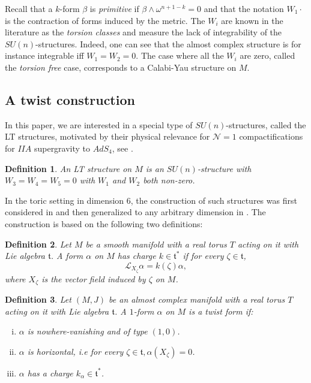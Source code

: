 \documentclass[12pt, reqno]{amsart}
\newtheorem{Def}{Definition}[subsection]
\theoremstyle{definition}
\newcommand{\tor}{\mathfrak{t}}
\newcommand{\lied}{\mathcal{L}}
\begin{document}
    Recall that a $k$-form $\beta$ is \textit{primitive} if $\beta\wedge\omega^{n+1-k}=0$ and that the notation $W_1\cdot$ is the contraction of forms induced by the metric. The $W_i$ are known in the literature as the \textit{torsion classes} and measure the lack of integrability of the $SU(n)$-structures. Indeed, one can see that the almost complex structure is for instance integrable iff $W_1=W_2=0$. The case where all the $W_i$ are zero, called the \textit{torsion free} case, corresponds to a Calabi-Yau structure on $M$.
\subsection{A twist construction}\label{2.2}
In this paper, we are interested in a special type of $SU(n)$-structures, called the LT structures, motivated by their physical relevance for $\mathcal{N}=1$ compactifications for $IIA$ supergravity to $AdS_4$, see \cite{Lust_2005}. 
\begin{Def}\label{LT}
    An LT structure on $M$ is an $SU(n)$-structure with $W_3=W_4=W_5=0$ with $W_1$ and $W_2$ both non-zero.
\end{Def}
In the toric setting in dimension $6$, the construction of such structures was first considered in \cite{Larfors_2010} and then generalized to any arbitrary dimension in \cite{peres2026sunstructuresquotienttorusactions}. The construction is based on the following two definitions:
\begin{Def}\label{chargedef}
    Let $M$ be a smooth manifold with a real torus $T$ acting on it with Lie algebra $\tor$. A form $\alpha$ on $M$ has charge $k\in\tor^*$ if for every $\zeta\in\tor$, $$\lied_{X_\zeta}\alpha=k(\zeta)\alpha,$$ where $X_\zeta$ is the vector field induced by $\zeta$ on $M$.
\end{Def}
\begin{Def}\label{twistdef}
    Let $(M,J)$ be an almost complex manifold with a real torus $T$ acting on it with Lie algebra $\tor$. A $1$-form $\alpha$ on $M$ is a twist form if:
    \begin{enumerate}[i)]
        \item $\alpha$ is nowhere-vanishing and of type $(1,0)$.
        \item $\alpha$ is horizontal, i.e for every $\zeta\in\tor, \alpha(X_\zeta)=0$. 
        \item $\alpha$ has a charge $k_\alpha\in\tor^*$.
    \end{enumerate}
\end{Def}
\end{document}
